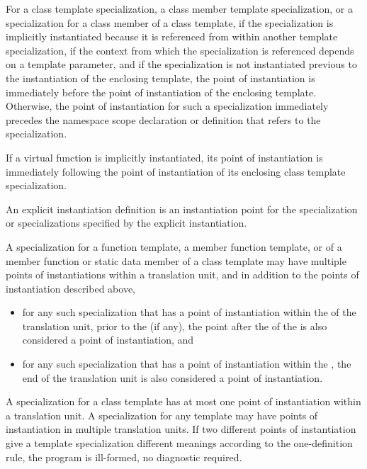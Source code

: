 \pnum
For a class template specialization, a class member template specialization,
or a specialization for a class member of a class template,
if the specialization is implicitly instantiated because it is referenced
from within another template specialization,
if the context from which the specialization is referenced depends on a
template parameter,
and if the specialization is not instantiated previous to the instantiation of
the enclosing template,
the point of instantiation is immediately before the point of instantiation of
the enclosing template.
Otherwise, the point of instantiation for such a specialization immediately
precedes the namespace scope declaration
or definition that refers to the specialization.

\pnum
If a virtual function is implicitly instantiated, its point of instantiation
is immediately following the point of instantiation of its enclosing class
template specialization.

\pnum
An explicit instantiation definition is an instantiation
point for the specialization or specializations specified by the explicit
instantiation.

\pnum
A specialization for a function template, a member function template,
or of a member function or static data member of a class template may have
multiple points of instantiations within a translation unit, and in addition
to the points of instantiation described above,
\begin{itemize}
\item
for any such
specialization that has a point of instantiation within the
 of the
translation unit,
prior to the  (if any),
the point after the 
of the 
is also considered a point of instantiation,
and
\item
for any such specialization that has a point of instantiation
within the ,
the end of the translation unit is also
considered a point of instantiation.
\end{itemize}
A specialization for a class template has at most one point of instantiation
within a translation unit.
A specialization for any template may have points of instantiation in multiple
translation units.
If two different points of instantiation give a template specialization
different meanings according to the one-definition rule,
the program is ill-formed, no diagnostic required.

